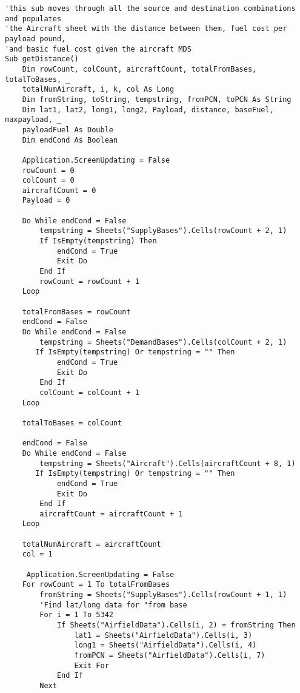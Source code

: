 \begin{lstlisting}
'this sub moves through all the source and destination combinations and populates 
'the Aircraft sheet with the distance between them, fuel cost per payload pound, 
'and basic fuel cost given the aircraft MDS
Sub getDistance()
    Dim rowCount, colCount, aircraftCount, totalFromBases, totalToBases, _
    totalNumAircraft, i, k, col As Long
    Dim fromString, toString, tempstring, fromPCN, toPCN As String
    Dim lat1, lat2, long1, long2, Payload, distance, baseFuel, maxpayload, _
    payloadFuel As Double
    Dim endCond As Boolean
    
    Application.ScreenUpdating = False
    rowCount = 0
    colCount = 0
    aircraftCount = 0
    Payload = 0
    
    Do While endCond = False
        tempstring = Sheets("SupplyBases").Cells(rowCount + 2, 1)
        If IsEmpty(tempstring) Then
            endCond = True
            Exit Do
        End If
        rowCount = rowCount + 1
    Loop
    
    totalFromBases = rowCount
    endCond = False
    Do While endCond = False
        tempstring = Sheets("DemandBases").Cells(colCount + 2, 1)
       If IsEmpty(tempstring) Or tempstring = "" Then
            endCond = True
            Exit Do
        End If
        colCount = colCount + 1
    Loop
    
    totalToBases = colCount
    
    endCond = False
    Do While endCond = False
        tempstring = Sheets("Aircraft").Cells(aircraftCount + 8, 1)
       If IsEmpty(tempstring) Or tempstring = "" Then
            endCond = True
            Exit Do
        End If
        aircraftCount = aircraftCount + 1
    Loop
        
    totalNumAircraft = aircraftCount
    col = 1
     
     Application.ScreenUpdating = False
    For rowCount = 1 To totalFromBases
        fromString = Sheets("SupplyBases").Cells(rowCount + 1, 1)
        'Find lat/long data for "from base
        For i = 1 To 5342
            If Sheets("AirfieldData").Cells(i, 2) = fromString Then
                lat1 = Sheets("AirfieldData").Cells(i, 3)
                long1 = Sheets("AirfieldData").Cells(i, 4)
                fromPCN = Sheets("AirfieldData").Cells(i, 7)
                Exit For
            End If
        Next
        

\end{lstlisting}
